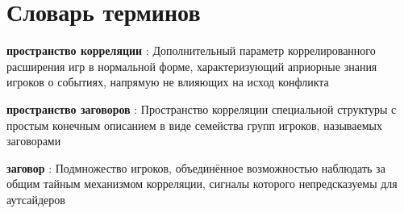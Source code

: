 \chapter*{Словарь терминов}             %

\textbf{пространство корреляции} : Дополнительный параметр коррелированного расширения игр в нормальной форме, характеризующий априорные знания игроков о событиях, напрямую не влияющих на исход конфликта

\textbf{пространство заговоров} : Пространство корреляции специальной структуры с простым конечным описанием в виде семейства групп игроков, называемых заговорами

\textbf{заговор} : Подмножество игроков, объединённое возможностью наблюдать за общим тайным механизмом корреляции, сигналы которого непредсказуемы для аутсайдеров

